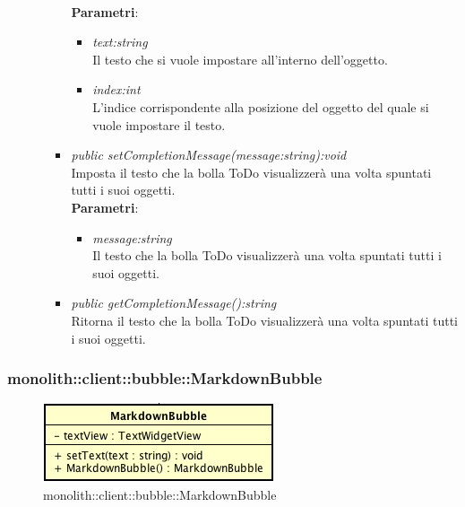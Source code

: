 \begin{itemize}
\begin{itemize}
\begin{itemize}
		\\ \textbf{Parametri}: \begin{itemize}
		\item \textit{text:string}\\
		Il testo che si vuole impostare all'interno dell'oggetto.
		\item \textit{index:int}\\
		L'indice corrispondente alla posizione del oggetto del quale si vuole impostare il testo.
		\end{itemize}
\item \textit{public setCompletionMessage(message:string):void}\\
Imposta il testo che la bolla ToDo visualizzerà una volta spuntati tutti i suoi oggetti.
	\\ \textbf{Parametri}: \begin{itemize}
		\item \textit{message:string}\\
		Il testo che la bolla ToDo visualizzerà una volta spuntati tutti i suoi oggetti.
	\end{itemize}
\item \textit{public getCompletionMessage():string}\\
Ritorna il testo che la bolla ToDo visualizzerà una volta spuntati tutti i suoi oggetti.

\end{itemize}
\end{itemize}
\end{itemize}

\subsubsection{monolith::client::bubble::MarkdownBubble}

\label{monolith::client::bubble::MarkdownBubble}
\begin{figure}[H]
	\centering
	\includegraphics[scale=0.5]{Sezioni/SottosezioniST/img/MarkdownBubble.png}
	\caption{monolith::client::bubble::MarkdownBubble}
\end{figure}


